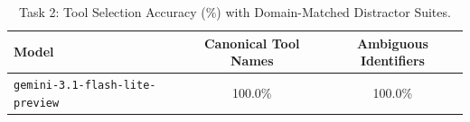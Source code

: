\begin{table}[t]
\centering
\small
\caption{Task 2: Tool Selection Accuracy (\%) with Domain-Matched Distractor Suites.}
\label{tab:task2_selection}
\begin{tabular}{lcc}
\toprule
\textbf{Model} & \textbf{Canonical Tool Names} & \textbf{Ambiguous Identifiers} \\
\midrule
\texttt{gemini-3.1-flash-lite-preview} & 100.0\% & 100.0\% \\
\bottomrule
\end{tabular}
\end{table}